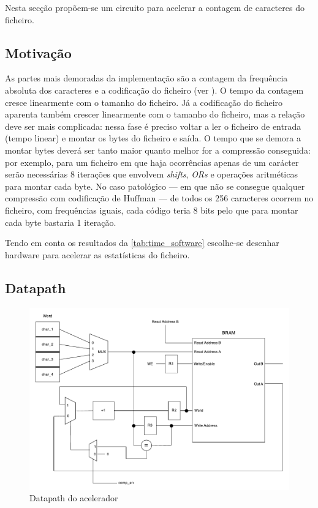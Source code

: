 Nesta secção propõem-se um circuito para acelerar a contagem de caracteres do ficheiro.

\subsection{Motivação}
  As partes mais demoradas da implementação são a contagem da frequência absoluta dos caracteres e a codificação do ficheiro (ver ). O tempo da contagem cresce linearmente com o tamanho do ficheiro. Já a codificação do ficheiro aparenta também crescer linearmente com o tamanho do ficheiro, mas a relação deve ser mais complicada: nessa fase é preciso voltar a ler o ficheiro de entrada (tempo linear) e montar os bytes do ficheiro e saída. O tempo que se demora a montar bytes deverá ser tanto maior quanto melhor for a compressão conseguida: por exemplo, para um ficheiro em que haja ocorrências apenas de um carácter serão necessárias 8 iterações que envolvem \textit{shifts}, \textit{ORs} e operações aritméticas para montar cada byte. No caso patológico --- em que não se consegue qualquer compressão com codificação de Huffman --- de todos os 256 caracteres ocorrem no ficheiro, com frequências iguais, cada código teria 8 bits pelo que para montar cada byte bastaria 1 iteração.

  Tendo em conta os resultados da \autoref{tab:time_software} escolhe-se desenhar hardware para acelerar as estatísticas do ficheiro.

  \subsection{Datapath}

  \begin{figure}[H]
    \centerline{
    	\includegraphics[width=0.65\paperwidth]{img/hw_datapath}
    }
    \caption{Datapath do acelerador}
    \label{fig:hw_datapath}
  \end{figure}

